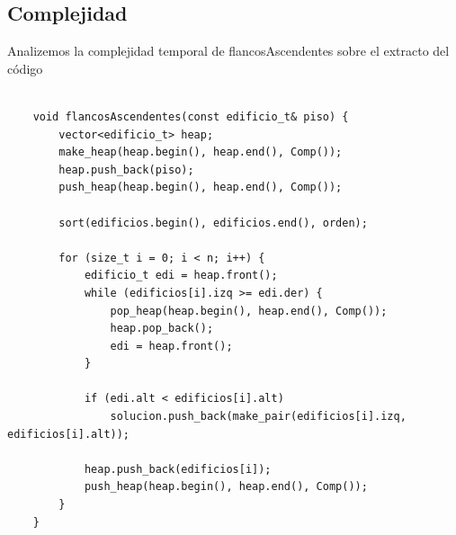 \subsection{Complejidad}

Analizemos la complejidad temporal de flancosAscendentes sobre el extracto del c\'odigo


\begin{lstlisting}

	void flancosAscendentes(const edificio_t& piso) {
		vector<edificio_t> heap;								        
		make_heap(heap.begin(), heap.end(), Comp()); 		
		heap.push_back(piso);						  							
		push_heap(heap.begin(), heap.end(), Comp());    

		sort(edificios.begin(), edificios.end(), orden);  

		for (size_t i = 0; i < n; i++) {  
			edificio_t edi = heap.front();								
			while (edificios[i].izq >= edi.der) {
				pop_heap(heap.begin(), heap.end(), Comp()); 
				heap.pop_back();							   						
				edi = heap.front();											    
			}

			if (edi.alt < edificios[i].alt) 							
				solucion.push_back(make_pair(edificios[i].izq, edificios[i].alt)); 	

			heap.push_back(edificios[i]);									
			push_heap(heap.begin(), heap.end(), Comp());  
		}
	}

\end{lstlisting}

